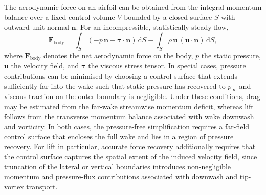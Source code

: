 \documentclass[wes, manuscript]{copernicus}
\begin{document}
%

The aerodynamic force on an airfoil can be obtained from the integral momentum balance over a fixed control volume $V$ bounded by a closed surface $S$ with outward unit normal $\mathbf{n}$. For an incompressible, statistically steady flow,
\begin{equation}
\mathbf{F}_{\mathrm{body}}
=
\int_{S}\left(-p\,\mathbf{n} + \boldsymbol{\tau}\cdot\mathbf{n}\right)\,\mathrm{d}S
-
\int_{S}\rho\,\mathbf{u}\,(\mathbf{u}\cdot\mathbf{n})\,\mathrm{d}S,
\label{eq:CV_momentum_steady}
\end{equation}
where $\mathbf{F}_{\mathrm{body}}$ denotes the net aerodynamic force on the body, $p$ the static pressure, $\mathbf{u}$ the velocity field, and $\boldsymbol{\tau}$ the viscous stress tensor. In special cases, pressure contributions can be minimised by choosing a control surface that extends sufficiently far into the wake such that static pressure has recovered to $p_{\infty}$ and viscous traction on the outer boundary is negligible. Under these conditions, drag may be estimated from the far-wake streamwise momentum deficit, whereas lift follows from the transverse momentum balance associated with wake downwash and vorticity. In both cases, the pressure-free simplification requires a far-field control surface that encloses the full wake and lies in a region of pressure recovery. For lift in particular, accurate force recovery additionally requires that the control surface captures the spatial extent of the induced velocity field, since truncation of the lateral or vertical boundaries introduces non-negligible momentum and pressure-flux contributions associated with downwash and tip-vortex transport.
\end{document}
